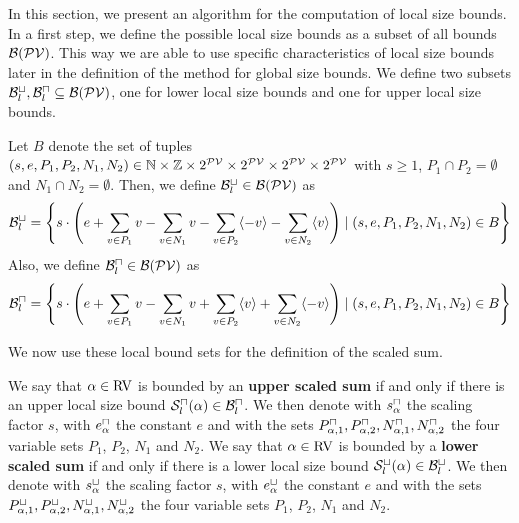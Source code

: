 In this section, we present an algorithm for the computation of local size bounds.
In a first step, we define the possible local size bounds as a subset of all bounds $\mathcal{B}(\mathcal{PV})$.
This way we are able to use specific characteristics of local size bounds later in the definition of the method for global size bounds.
We define two subsets $\mathcal{B}^\sqcup_l, \mathcal{B}^\sqcap_l \subseteq \mathcal{B}(\mathcal{PV})$, one for lower local size bounds and one for upper local size bounds.

\begin{definition}
  Let $B$ denote the set of tuples $(s,e,P_1,P_2,N_1,N_2) \in \mathbb{N} \times \mathbb{Z} \times 2^{\mathcal{PV}} \times 2^{\mathcal{PV}} \times 2^{\mathcal{PV}} \times 2^{\mathcal{PV}}$ with $s \geq 1$, $P_1 \cap P_2 = \emptyset$ and $N_1 \cap N_2 = \emptyset$.
  Then, we define $\mathcal{B}^\sqcup_l \in \mathcal{B}(\mathcal{PV})$ as 
  \[ \mathcal{B}^\sqcup_l = \left\{
    s \cdot \left(
        e
      + \sum_{v \in P_1} v
      - \sum_{v \in N_1} v
      - \sum_{v \in P_2} \langle-v\rangle
      - \sum_{v \in N_2} \langle v\rangle
      \right) \mid (s,e,P_1,P_2,N_1,N_2) \in B \right\} \]
  Also, we define $\mathcal{B}^\sqcap_l \in \mathcal{B}(\mathcal{PV})$ as 
  \[ \mathcal{B}^\sqcap_l = \left\{
    s \cdot \left(
        e
      + \sum_{v \in P_1} v
      - \sum_{v \in N_1} v
      + \sum_{v \in P_2} \langle v\rangle
      + \sum_{v \in N_2} \langle-v\rangle
      \right) \mid (s,e,P_1,P_2,N_1,N_2) \in B \right\} \]
\end{definition}

We now use these local bound sets for the definition of the scaled sum.

\begin{definition}
  We say that $\alpha \in \text{RV}$ is bounded by an \textbf{upper scaled sum} if and only if there is an upper local size bound ${\mathcal{S}^\sqcap_l}(\alpha) \in \mathcal{B}^\sqcap_l$.
  We then denote with $s^\sqcap_\alpha$ the scaling factor $s$, with $e^\sqcap_\alpha$ the constant $e$ and with the sets $P_{\alpha,1}^\sqcap, P_{\alpha,2}^\sqcap, N_{\alpha,1}^\sqcap, N_{\alpha,2}^\sqcap$ the four variable sets $P_1$, $P_2$, $N_1$ and $N_2$.
  We say that $\alpha \in \text{RV}$ is bounded by a \textbf{lower scaled sum} if and only if there is a lower local size bound ${\mathcal{S}^\sqcup_l}(\alpha) \in \mathcal{B}^\sqcup_l$.
  We then denote with $s^\sqcup_\alpha$ the scaling factor $s$, with $e^\sqcup_\alpha$ the constant $e$ and with the sets $P_{\alpha,1}^\sqcup, P_{\alpha,2}^\sqcup, N_{\alpha,1}^\sqcup, N_{\alpha,2}^\sqcup$ the four variable sets $P_1$, $P_2$, $N_1$ and $N_2$.
\end{definition}

